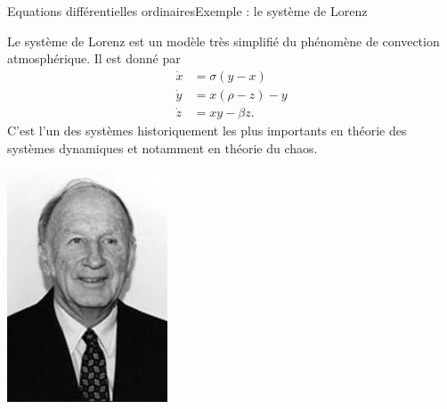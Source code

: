 \documentclass[usenames,dvipsnames,svgnames,10pt,aspectratio=169]{beamer}
\begin{document}
\begin{frame}[t, c]{Equations différentielles ordinaires}{Exemple : le système de Lorenz}
  \begin{minipage}{.68\textwidth}
    Le système de Lorenz est un modèle très simplifié du phénomène de convection atmosphérique.
    Il est donné par
    \[
    \begin{aligned}
      \dot{x} & = \sigma ( y - x ) \\
      \dot{y} & = x ( \rho - z) - y \\
      \dot{z} & = xy - \beta z.
    \end{aligned}
    \]
    C'est l'un des systèmes historiquement les plus importants en théorie des systèmes dynamiques et notamment en théorie du chaos.
  \end{minipage}%
  \hfill
  \begin{minipage}{.28\textwidth}
    \centering
    \includegraphics[width=\textwidth]{portrait_lorenz}
  \end{minipage}
\end{frame}
\end{document}
